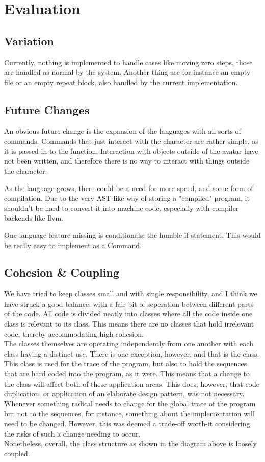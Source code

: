 \chapter{Evaluation}

\section{Variation}
Currently, nothing is implemented to handle cases like moving zero steps, those are handled as normal by the system. Another thing are for instance an empty file or an empty repeat block, also handled
by the current implementation.

\section{Future Changes}
An obvious future change is the expansion of the languages with all sorts of commands. Commands that just interact with the character are rather simple, as it is passed in to the function. Interaction
with objects outside of the avatar have not been written, and therefore there is no way to interact with things outside the character. 

As the language grows, there could be a need for more speed, and some form of compilation. Due to the very AST-like way of storing a "compiled" program, it shouldn't be hard to convert it into machine
code, especially with compiler backends like llvm.

One language feature missing is conditionals: the humble if-statement. This would be really easy to implement as a Command.

\section{Cohesion \& Coupling}
We have tried to keep classes small and with single responsibility, and I think we have struck a good balance, with a fair bit of seperation between different parts of the code.
All code is divided neatly into classes where all the code inside one class is relevant to its class. This means there are no classes that hold irrelevant code, thereby accommodating high cohesion. \\
The classes themselves are operating independently from one another with each class having a distinct use. There is one exception, however, and that is the  class. This class is used for the trace of the program, but also to hold the sequences that are hard coded into the program, as it were. This means that a change to the  class will affect both of these application areas. This does, however, that code duplication, or application of an elaborate design pattern, was not necessary. Whenever something radical needs to change for the global trace of the program but not to the sequences, for instance, something about the implementation will need to be changed. However, this was deemed a trade-off worth-it considering the risks of such a change needing to occur. \\
Nonetheless, overall, the class structure as shown in the diagram above is loosely coupled. 
